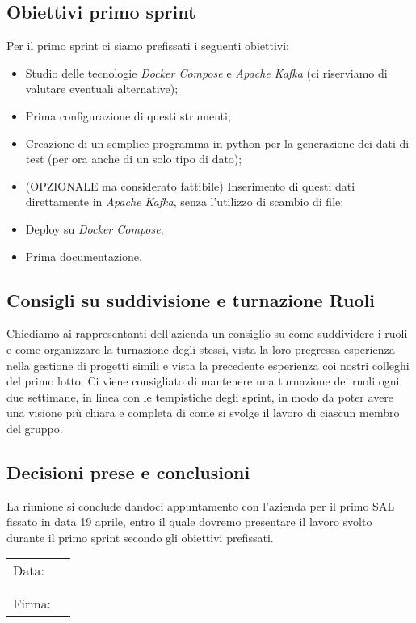 \documentclass[italian,12pt]{article}
\begin{document}
\subsection{Obiettivi primo sprint}
Per il primo sprint ci siamo prefissati i seguenti obiettivi:
\begin{itemize}
	\item Studio delle tecnologie \textit{Docker Compose} e \textit{Apache Kafka} (ci riserviamo di valutare eventuali alternative);
	\item Prima configurazione di questi strumenti;
	\item Creazione di un semplice programma in python per la generazione dei dati di test (per ora anche di un solo tipo di dato);
	\item (OPZIONALE ma considerato fattibile) Inserimento di questi dati direttamente in \textit{Apache Kafka}, senza l'utilizzo di scambio di file;
	\item Deploy su \textit{Docker Compose};
	\item Prima documentazione.
\end{itemize}

\subsection{Consigli su suddivisione e turnazione Ruoli}
Chiediamo ai rappresentanti dell'azienda un consiglio su come suddividere i ruoli e come 
organizzare la turnazione degli stessi, vista la loro pregressa esperienza nella gestione 
di progetti simili e vista la precedente esperienza coi nostri colleghi del primo lotto. 
Ci viene consigliato di mantenere una turnazione dei ruoli ogni due settimane, in linea con 
le tempistiche degli sprint, in modo da poter avere una visione più chiara e completa di 
come si svolge il lavoro di ciascun membro del gruppo.

\subsection{Decisioni prese e conclusioni}
La riunione si conclude dandoci appuntamento con l'azienda per il primo SAL fissato 
in data 19 aprile, entro il quale dovremo presentare il lavoro svolto durante il primo sprint 
secondo gli obiettivi prefissati.

\newpage
\begin{table}[b]
	\begin{tabular}{@{}p{.5in}p{4in}@{}}
		Data:  & \hrulefill \\
			   &     		\\
			   &     		\\
		Firma: & \hrulefill \\
	\end{tabular}
	\end{table}
\end{document}
